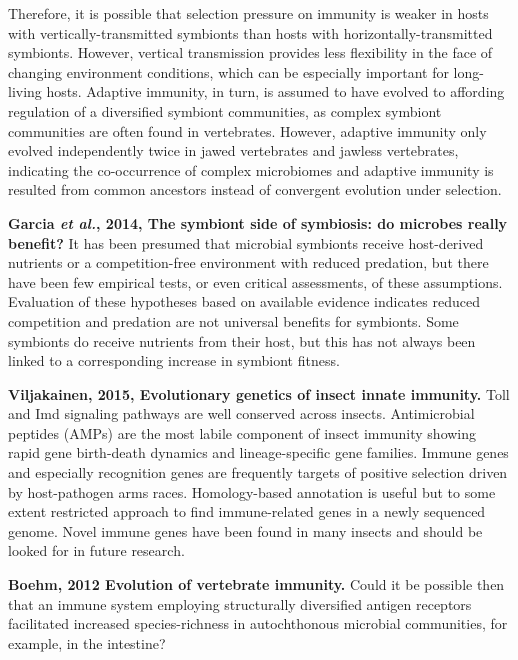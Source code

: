 \documentclass[11pt]{article}
\begin{document}
\begin{sloppypar}
Therefore, it is possible that selection pressure on immunity is weaker in hosts with vertically-transmitted symbionts than hosts with horizontally-transmitted symbionts. 
However, vertical transmission provides less flexibility in the face of changing environment conditions, which can be especially important for long-living hosts. 
Adaptive immunity, in turn, is assumed to have evolved to affording regulation of a diversified symbiont communities, as complex symbiont communities are often found in vertebrates. 
However, adaptive immunity only evolved independently twice in jawed vertebrates and jawless vertebrates, indicating the co-occurrence of complex microbiomes and adaptive immunity is resulted from common ancestors instead of convergent evolution under selection. 
\par \newline \newline
\textbf{Garcia \textit{et al.}, 2014, The symbiont side of symbiosis: do microbes really benefit?} \newline
It has been presumed that microbial symbionts receive host-derived nutrients or a competition-free environment with reduced predation, but there have been few empirical tests, or even critical assessments, of these assumptions. 
Evaluation of these hypotheses based on available evidence indicates reduced competition and predation are not universal benefits for symbionts. 
Some symbionts do receive nutrients from their host, but this has not always been linked to a corresponding increase in symbiont fitness.
\par
\textbf{Viljakainen, 2015, Evolutionary genetics of insect innate immunity.} \newline
Toll and Imd signaling pathways are well conserved across insects. 
Antimicrobial peptides (AMPs) are the most labile component of insect immunity showing rapid gene birth-death dynamics and lineage-specific gene families. 
Immune genes and especially recognition genes are frequently targets of positive selection driven by host-pathogen arms races. 
Homology-based annotation is useful but to some extent restricted approach to find immune-related genes in a newly sequenced genome. 
Novel immune genes have been found in many insects and should be looked for in future research.
\par
\textbf{Boehm, 2012 Evolution of vertebrate immunity.} \newline
Could it be possible then that an immune system employing structurally diversified antigen receptors facilitated increased species-richness in autochthonous microbial communities, for example, in the intestine? 

\end{sloppypar}
\end{document}
